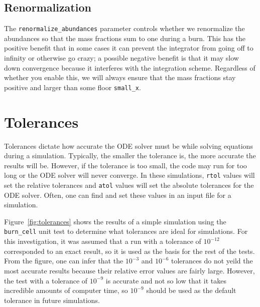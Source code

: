 

\subsection{Renormalization}

The {\tt renormalize\_abundances} parameter controls whether we
renormalize the abundances so that the mass fractions sum to one
during a burn. This has the positive benefit that in some cases it can
prevent the integrator from going off to infinity or otherwise go
crazy; a possible negative benefit is that it may slow down
convergence because it interferes with the integration
scheme. Regardless of whether you enable this, we will always ensure
that the mass fractions stay positive and larger than some floor
{\tt small\_x}.



\section{Tolerances}
Tolerances dictate how accurate the ODE solver must be while solving 
equations during a simulation. 
Typically, the smaller the tolerance is, the more accurate the results will be. 
However, if the tolerance is too small, the code may run for too long
or the ODE solver will never converge. 
In these simulations, 
{\tt rtol} values will set the relative tolerances and
{\tt atol} values will set the absolute tolerances for the ODE solver. 
Often, one can find and set these values in an input file for a simulation. 

Figure~\ref{fig:tolerances} shows the results of a simple simulation using the 
{\tt burn\_cell} unit test to determine 
what tolerances are ideal for simulations.
For this investigation, it was assumed that a run with a tolerance of $10^{-12}$
corresponded to an exact result, 
so it is used as the basis for the rest of the tests. 
From the figure, one can infer that the $10^{-3}$ and $10^{-6}$ tolerances
do not yeild the most accurate results
because their relative error values are fairly large. 
However, the test with a tolerance of $10^{-9}$ is accurate 
and not so low that it takes incredible amounts of computer time, 
so $10^{-9}$ should be used as the default tolerance in future simulations. 

